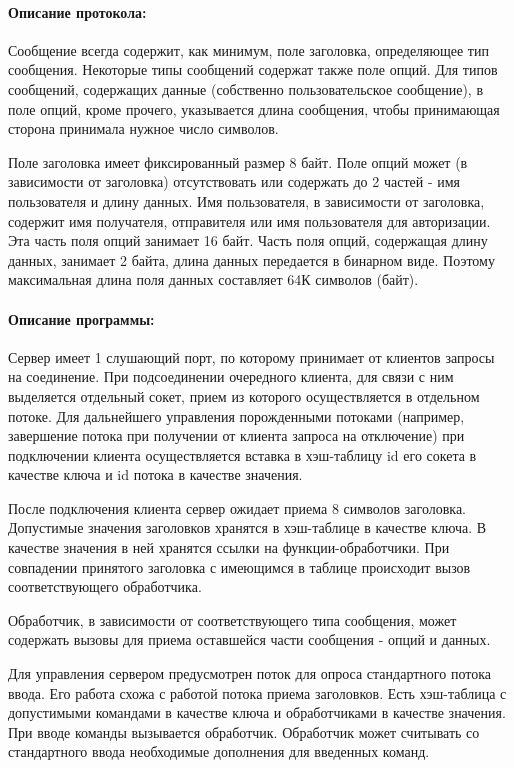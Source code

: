 \paragraph{Описание протокола:}

Сообщение всегда содержит, как минимум, поле заголовка, определяющее тип сообщения. Некоторые типы сообщений содержат также поле опций. Для типов сообщений, содержащих данные (собственно пользовательское сообщение), в поле опций, кроме прочего, указывается длина сообщения, чтобы принимающая сторона принимала нужное число символов.

Поле заголовка имеет фиксированный размер 8 байт. Поле опций может (в зависимости от заголовка) отсутствовать или содержать до 2 частей - имя пользователя и длину данных. Имя пользователя, в зависимости от заголовка, содержит имя получателя, отправителя или имя пользователя для авторизации. Эта часть поля опций занимает 16 байт. Часть поля опций, содержащая длину данных, занимает 2 байта, длина данных передается в бинарном виде. Поэтому максимальная длина поля данных составляет 64К символов (байт).

\paragraph{Описание программы:}

Сервер имеет 1 слушающий порт, по которому принимает от клиентов запросы на соединение. При подсоединении очередного клиента, для связи с ним выделяется отдельный сокет, прием из которого осуществляется в отдельном потоке. Для дальнейшего управления порожденными потоками (например, завершение потока при получении от клиента запроса на отключение) при подключении клиента осуществляется вставка в хэш-таблицу id его сокета в качестве ключа и id потока в качестве значения.

После подключения клиента сервер ожидает приема 8 символов заголовка. Допустимые значения заголовков хранятся в хэш-таблице в качестве ключа. В качестве значения в ней хранятся ссылки на функции-обработчики. При совпадении принятого заголовка с имеющимся в таблице происходит вызов соответствующего обработчика.

Обработчик, в зависимости от соответствующего типа сообщения, может содержать вызовы для приема оставшейся части сообщения - опций и данных.

Для управления сервером предусмотрен поток для опроса стандартного потока ввода. Его работа схожа с работой потока приема заголовков. Есть хэш-таблица с допустимыми командами в качестве ключа и обработчиками в качестве значения. При вводе команды вызывается обработчик. Обработчик может считывать со стандартного ввода необходимые дополнения для введенных команд.

